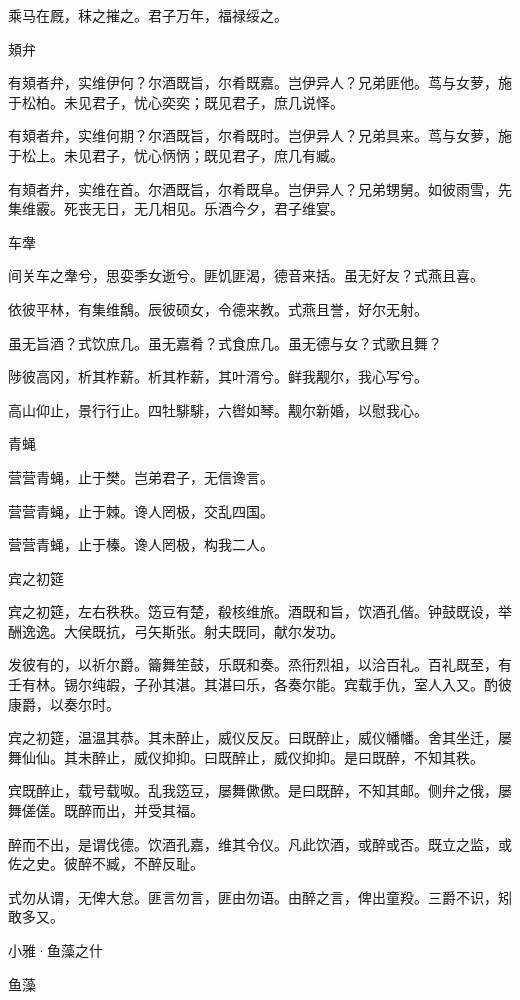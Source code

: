 乘马在厩，秣之摧之。君子万年，福禄绥之。

頍弁

有頍者弁，实维伊何？尔酒既旨，尔肴既嘉。岂伊异人？兄弟匪他。茑与女萝，施于松柏。未见君子，忧心奕奕；既见君子，庶几说怿。

有頍者弁，实维何期？尔酒既旨，尔肴既时。岂伊异人？兄弟具来。茑与女萝，施于松上。未见君子，忧心怲怲；既见君子，庶几有臧。

有頍者弁，实维在首。尔酒既旨，尔肴既阜。岂伊异人？兄弟甥舅。如彼雨雪，先集维霰。死丧无日，无几相见。乐酒今夕，君子维宴。

车舝

间关车之舝兮，思娈季女逝兮。匪饥匪渴，德音来括。虽无好友？式燕且喜。

依彼平林，有集维鷮。辰彼硕女，令德来教。式燕且誉，好尔无射。

虽无旨酒？式饮庶几。虽无嘉肴？式食庶几。虽无德与女？式歌且舞？

陟彼高冈，析其柞薪。析其柞薪，其叶湑兮。鲜我觏尔，我心写兮。

高山仰止，景行行止。四牡騑騑，六辔如琴。觏尔新婚，以慰我心。

青蝇

营营青蝇，止于樊。岂弟君子，无信谗言。

营营青蝇，止于棘。谗人罔极，交乱四国。

营营青蝇，止于榛。谗人罔极，构我二人。

宾之初筵

宾之初筵，左右秩秩。笾豆有楚，殽核维旅。酒既和旨，饮酒孔偕。钟鼓既设，举酬逸逸。大侯既抗，弓矢斯张。射夫既同，献尔发功。

发彼有的，以祈尔爵。籥舞笙鼓，乐既和奏。烝衎烈祖，以洽百礼。百礼既至，有壬有林。锡尔纯嘏，子孙其湛。其湛曰乐，各奏尔能。宾载手仇，室人入又。酌彼康爵，以奏尔时。

宾之初筵，温温其恭。其未醉止，威仪反反。曰既醉止，威仪幡幡。舍其坐迁，屡舞仙仙。其未醉止，威仪抑抑。曰既醉止，威仪抑抑。是曰既醉，不知其秩。

宾既醉止，载号载呶。乱我笾豆，屡舞僛僛。是曰既醉，不知其邮。侧弁之俄，屡舞傞傞。既醉而出，并受其福。

醉而不出，是谓伐德。饮酒孔嘉，维其令仪。凡此饮酒，或醉或否。既立之监，或佐之史。彼醉不臧，不醉反耻。

式勿从谓，无俾大怠。匪言勿言，匪由勿语。由醉之言，俾出童羖。三爵不识，矧敢多又。




小雅·鱼藻之什


鱼藻

